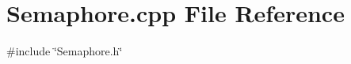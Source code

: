 \section{Semaphore.\+cpp File Reference}
\label{_semaphore_8cpp}
{\ttfamily \#include \char`\"{}Semaphore.\+h\char`\"{}}\newline
